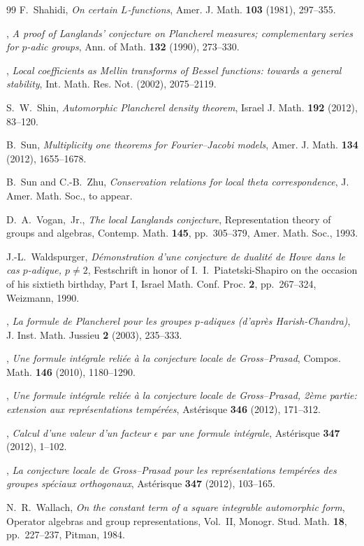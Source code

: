\documentclass[11pt]{amsart}
\numberwithin{equation}{section}
\theoremstyle{plain}
\theoremstyle{definition}
\theoremstyle{remark}
\begin{document}
\begin{thebibliography}{99}
F.~Shahidi,
\emph{On certain $L$-functions},
Amer. J. Math. \textbf{103} (1981), 297--355.

\bysame,
\emph{A proof of Langlands' conjecture on Plancherel measures; complementary series for $p$-adic groups},
Ann. of Math. \textbf{132} (1990), 273--330.

\bysame,
\emph{Local coefficients as Mellin transforms of Bessel functions: towards a general stability},
Int. Math. Res. Not. (2002), 2075--2119.

S.~W.~Shin,
\emph{Automorphic Plancherel density theorem},
Israel J. Math. \textbf{192} (2012), 83--120.

B.~Sun,
\emph{Multiplicity one theorems for Fourier--Jacobi models},
Amer. J. Math. \textbf{134} (2012), 1655--1678.

B.~Sun and C.-B.~Zhu,
\emph{Conservation relations for local theta correspondence},
J. Amer. Math. Soc., to appear.

D.~A.~Vogan,~Jr.,
\emph{The local Langlands conjecture},
Representation theory of groups and algebras,
Contemp. Math. \textbf{145}, pp.~305--379, Amer. Math. Soc., 1993.

J.-L.~Waldspurger,
\emph{D\'emonstration d'une conjecture de dualit\'e de Howe dans le cas $p$-adique, $p \ne 2$},
Festschrift in honor of I.~I.~Piatetski-Shapiro on the occasion of his sixtieth birthday, Part I,
Israel Math. Conf. Proc. \textbf{2}, pp.~267--324, Weizmann, 1990.

\bysame,
\emph{La formule de Plancherel pour les groupes $p$-adiques (d'apr\`es Harish-Chandra)},
J. Inst. Math. Jussieu \textbf{2} (2003), 235--333.

\bysame,
\emph{Une formule int\'egrale reli\'ee \`a la conjecture locale de Gross--Prasad},
Compos. Math. \textbf{146} (2010), 1180--1290.

\bysame,
\emph{Une formule int\'egrale reli\'ee \`a la conjecture locale de Gross--Prasad, 2\`eme partie: extension aux repr\'esentations temp\'er\'ees},
Ast\'erisque \textbf{346} (2012), 171--312.

\bysame,
\emph{Calcul d'une valeur d'un facteur $\epsilon$ par une formule int\'egrale},
Ast\'erisque \textbf{347} (2012), 1--102.

\bysame,
\emph{La conjecture locale de Gross--Prasad pour les repr\'esentations temp\'er\'ees des groupes sp\'eciaux orthogonaux},
Ast\'erisque \textbf{347} (2012), 103--165.

N.~R.~Wallach,
\emph{On the constant term of a square integrable automorphic form},
Operator algebras and group representations, Vol.~II,
Monogr. Stud. Math. \textbf{18}, pp.~227--237, Pitman, 1984.

\end{thebibliography}
\end{document}
